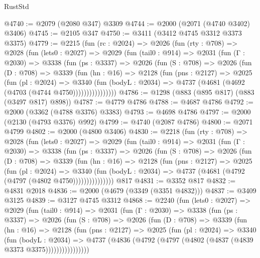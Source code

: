 \begin{lexlean}{RustStd}
\begin{coremodule}
@4740 := @2079 (@2080 @347) @3309
@4744 := @2000 (@2071 (@4740 @3402) @3406)
@4745 := @2105 @347
@4750 := @3411 (@3412 @4745 @3312 @3373 @3375)
@4779 := @2215
    (fun (rc : @2024) =>
    @2026
      (fun (rty : @708) =>
      @2028
        (fun (lets0 : @2027) =>
        @2029
          (fun (tail0 : @914) =>
          @2031
            (fun (Γ : @2030) =>
            @3338
              (fun (ps : @3337) =>
              @2026
                (fun (S : @708) =>
                @2026
                  (fun (D : @708) =>
                  @3339
                    (fun (hn : @16) =>
                    @2128
                      (fun (pns : @2127) =>
                      @2025
                        (fun (pl : @2024) =>
                        @3340
                          (fun (bodyL : @2034) =>
                          @4737 (@4681 (@4692 (@4703 (@4744 @4750))))))))))))))))
@4786 := @1298 (@883 (@895 @817) (@883 (@3497 @817) @898))
@4787 := @4779 @4786
@4788 := @4687 @4786
@4792 := @2000 (@3362 (@4788 @3376) @3383)
@4793 := @4698 @4786
@4797 := @2000 (@2130 (@4793 @3376) @992)
@4799 := @4740 (@2087 @4786)
@4800 := @2071 @4799
@4802 := @2000 (@4800 @3406)
@4830 := @2218
    (fun (rty : @708) =>
    @2028
      (fun (lets0 : @2027) =>
      @2029
        (fun (tail0 : @914) =>
        @2031
          (fun (Γ : @2030) =>
          @3338
            (fun (ps : @3337) =>
            @2026
              (fun (S : @708) =>
              @2026
                (fun (D : @708) =>
                @3339
                  (fun (hn : @16) =>
                  @2128
                    (fun (pns : @2127) =>
                    @2025
                      (fun (pl : @2024) =>
                      @3340
                        (fun (bodyL : @2034) =>
                        @4737 (@4681 (@4792 (@4797 (@4802 @4750)))))))))))))))
    @817
@4831 := @3352 @817
@4832 := @4831 @2018
@4836 := @2000 (@4679 (@3349 (@3351 @4832)))
@4837 := @3409 @3125
@4839 := @3127 @4745 @3312
@4868 := @2240
    (fun (lets0 : @2027) =>
    @2029
      (fun (tail0 : @914) =>
      @2031
        (fun (Γ : @2030) =>
        @3338
          (fun (ps : @3337) =>
          @2026
            (fun (S : @708) =>
            @2026
              (fun (D : @708) =>
              @3339
                (fun (hn : @16) =>
                @2128
                  (fun (pns : @2127) =>
                  @2025
                    (fun (pl : @2024) =>
                    @3340
                      (fun (bodyL : @2034) =>
                      @4737 (@4836 (@4792 (@4797 (@4802 (@4837 (@4839 @3373 @3375))))))))))))))))

\end{coremodule}
\end{lexlean}
